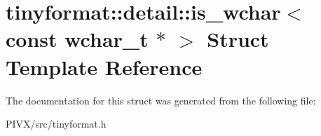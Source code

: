 \hypertarget{structtinyformat_1_1detail_1_1is__wchar_3_01const_01wchar__t_01_5_01_4}{}\section{tinyformat\+:\+:detail\+:\+:is\+\_\+wchar$<$ const wchar\+\_\+t $\ast$ $>$ Struct Template Reference}
\label{structtinyformat_1_1detail_1_1is__wchar_3_01const_01wchar__t_01_5_01_4}


The documentation for this struct was generated from the following file\+:\begin{DoxyCompactItemize}
\item 
P\+I\+V\+X/src/tinyformat.\+h\end{DoxyCompactItemize}

